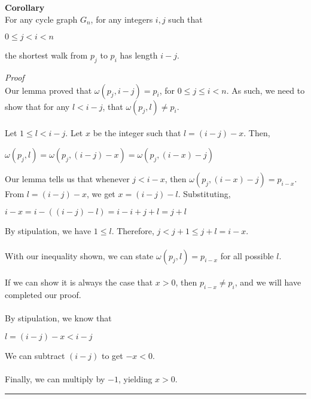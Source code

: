 \documentclass[a4paper,12pt]{article}
\begin{document}
\begin{tcolorbox}
\textbf{Corollary}\\
For any cycle graph $G_n$, for any integers $i, j$ such that
\begin{center}
$0 \leq j < i < n$
\end{center}
the shortest walk from $p_j$ to $p_i$ has length $i - j$.
\end{tcolorbox}
\noindent
\textit{Proof}\\
Our lemma proved that $\omega(p_j, i - j) = p_i$, for $0 \leq j \leq i < n$.
As such, we need to show that for any $l < i - j$, that $\omega(p_j, l) \neq p_i$.\\
\\
Let $1 \leq l < i - j$. Let $x$ be the integer such that $l = (i - j) - x$.
Then,
\begin{center}
$\omega(p_j, l) = \omega(p_j, (i - j) - x) = \omega(p_j, (i - x) - j)$ 
\end{center}
Our lemma tells us that whenever $j < i - x$, then $\omega(p_j, (i - x) - j) = p_{i-x}$.\\
From $l = (i - j) - x$, we get $x = (i - j) - l$. Substituting,
\begin{center}
$i - x = i - ((i - j) - l) = i - i + j + l = j + l$
\end{center}
By stipulation, we have $1 \leq l$. Therefore, $j < j + 1 \leq j + l = i - x$.\\
\\
With our inequality shown, we can state $\omega(p_j, l) = p_{i-x}$ for all possible $l$.\\
\\
If we can show it is always the case that $x > 0$, then $p_{i-x} \neq p_i$, and we will have completed our proof.\\
\\
By stipulation, we know that
\begin{center}
$l = (i - j) - x < i - j$
\end{center}
We can subtract $(i - j)$ to get $-x < 0$.\\
\\
Finally, we can multiply by $-1$, yielding $x > 0$.
\begin{center}
\noindent\rule{8cm}{0.4pt}
\end{center}
\end{document}
